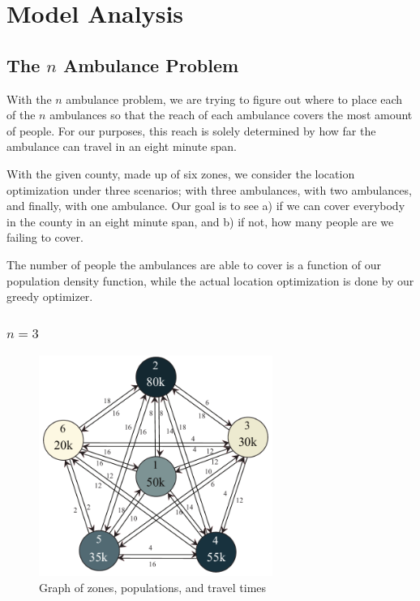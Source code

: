 \documentclass[notitlepage, 12pt]{article}
\begin{document}
\section{Model Analysis}

\subsection{The $n$ Ambulance Problem}
With the $n$ ambulance problem, we are trying to figure out where to place each of the $n$ ambulances so that the reach of each ambulance covers the most amount of people. For our purposes, this reach is solely determined by how far the ambulance can travel in an eight minute span.

With the given county, made up of six zones, we consider the location optimization under three scenarios; with three ambulances, with two ambulances, and finally, with one ambulance. Our goal is to see a) if we can cover everybody in the county in an eight minute span, and b) if not, how many people are we failing to cover.

The number of people the ambulances are able to cover is a function of our population density function, while the actual location optimization is done by our greedy optimizer.

\subsubsection{$n=3$}

\begin{figure}[htbp]
\begin{center}
\includegraphics[width=3in]{6point.pdf}
\caption{Graph of zones, populations, and travel times}
\label{fig:fullgraph}
\end{center}
\end{figure}
\end{document}
